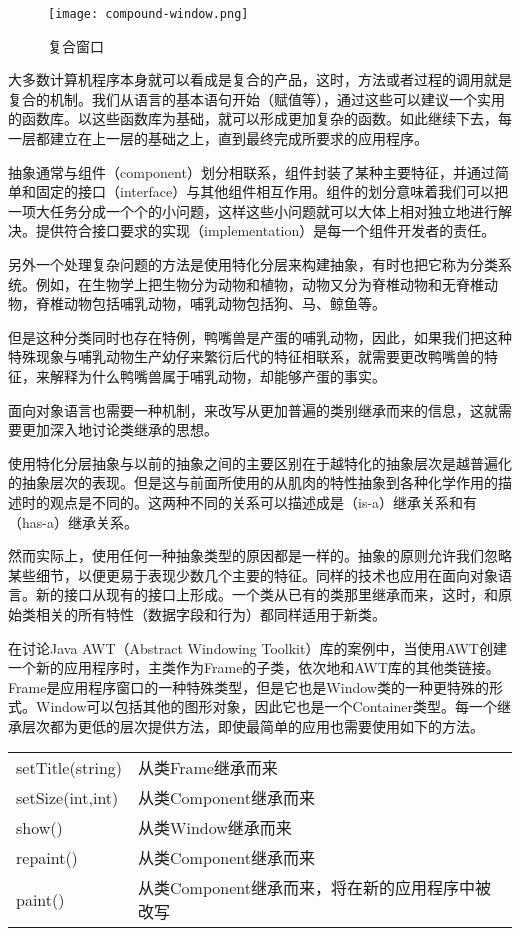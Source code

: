 \begin{figure}[htbp]
\centering
\texttt{[image: compound-window.png]}
\caption{复合窗口}
\label{fig:compound-window}
\end{figure}

大多数计算机程序本身就可以看成是复合的产品，这时，方法或者过程的调用就是复合的机制。我们从语言的基本语句开始（赋值等），通过这些可以建议一个实用的函数库。以这些函数库为基础，就可以形成更加复杂的函数。如此继续下去，每一层都建立在上一层的基础之上，直到最终完成所要求的应用程序。

抽象通常与组件（component）划分相联系，组件封装了某种主要特征，并通过简单和固定的接口（interface）与其他组件相互作用。组件的划分意味着我们可以把一项大任务分成一个个的小问题，这样这些小问题就可以大体上相对独立地进行解决。提供符合接口要求的实现（implementation）是每一个组件开发者的责任。



另外一个处理复杂问题的方法是使用特化分层来构建抽象，有时也把它称为分类系统。例如，在生物学上把生物分为动物和植物，动物又分为脊椎动物和无脊椎动物，脊椎动物包括哺乳动物，哺乳动物包括狗、马、鲸鱼等。

但是这种分类同时也存在特例，鸭嘴兽是产蛋的哺乳动物，因此，如果我们把这种特殊现象与哺乳动物生产幼仔来繁衍后代的特征相联系，就需要更改鸭嘴兽的特征，来解释为什么鸭嘴兽属于哺乳动物，却能够产蛋的事实。

面向对象语言也需要一种机制，来改写从更加普遍的类别继承而来的信息，这就需要更加深入地讨论类继承的思想。

使用特化分层抽象与以前的抽象之间的主要区别在于越特化的抽象层次是越普遍化的抽象层次的表现。但是这与前面所使用的从肌肉的特性抽象到各种化学作用的描述时的观点是不同的。这两种不同的关系可以描述成是（is-a）继承关系和有（has-a）继承关系。

然而实际上，使用任何一种抽象类型的原因都是一样的。抽象的原则允许我们忽略某些细节，以便更易于表现少数几个主要的特征。同样的技术也应用在面向对象语言。新的接口从现有的接口上形成。一个类从已有的类那里继承而来，这时，和原始类相关的所有特性（数据字段和行为）都同样适用于新类。

在讨论Java AWT（Abstract Windowing Toolkit）库的案例中，当使用AWT创建一个新的应用程序时，主类作为Frame的子类，依次地和AWT库的其他类链接。Frame是应用程序窗口的一种特殊类型，但是它也是Window类的一种更特殊的形式。Window可以包括其他的图形对象，因此它也是一个Container类型。每一个继承层次都为更低的层次提供方法，即使最简单的应用也需要使用如下的方法。

\begin{table}[htbp]
\centering
\begin{tabular}{ll}
setTitle(string)	&从类Frame继承而来\\
setSize(int,int)	&从类Component继承而来\\
show()			&从类Window继承而来\\
repaint()			&从类Component继承而来\\
paint()			&从类Component继承而来，将在新的应用程序中被改写\\
\end{tabular}
\end{table}

